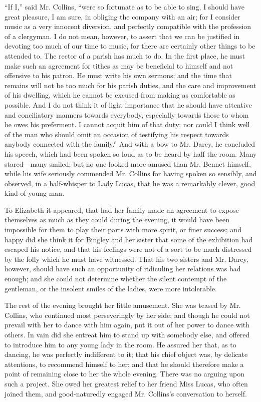 \documentclass[10pt]{book}
\begin{document}
   “If I,” said Mr. Collins, “were so fortunate as to be able to sing, I
should have great pleasure, I am sure, in obliging the company with an
air; for I consider music as a very innocent diversion, and perfectly
compatible with the profession of a clergyman. I do not mean, however,
to assert that we can be justified in devoting too much of our time to
music, for there are certainly other things to be attended to. The
rector of a parish has much to do. In the first place, he must make such
an agreement for tithes as may be beneficial to himself and not
offensive to his patron. He must write his own sermons; and the time
that remains will not be too much for his parish duties, and the care
and improvement of his dwelling, which he cannot be excused from making
as comfortable as possible. And I do not think it of light importance
that he should have attentive and conciliatory manners towards
everybody, especially towards those to whom he owes his preferment. I
cannot acquit him of that duty; nor could I think well
   of the man who
should omit an occasion of testifying his respect towards anybody
connected with the family.” And with a bow to Mr. Darcy, he concluded
his speech, which had been spoken so loud as to be heard by half the
room. Many stared—many smiled; but no one looked more amused than Mr.
Bennet himself, while his wife seriously commended Mr. Collins for
having spoken so sensibly, and observed, in a half-whisper to Lady
Lucas, that he was a remarkably clever, good kind of young man.
  

   To Elizabeth it appeared, that had her family made an agreement to
expose themselves as much as they could during the evening, it would
have been impossible for them to play their parts with more spirit, or
finer success; and happy did she think it for Bingley and her sister
that some of the exhibition had escaped his notice, and that his
feelings were not of a sort to be much distressed by the folly which he
must have witnessed. That his two sisters and Mr. Darcy, however, should
have such an opportunity of ridiculing her relations was bad enough; and
she could not determine whether the silent contempt of the gentleman, or
the insolent smiles of the ladies, were more intolerable.
  

   The rest of the evening brought her little amusement. She was teased by
Mr. Collins, who continued most perseveringly by her side; and though he
could not prevail with her to dance with him again, put it out of her
power to dance with others. In vain did she entreat him to stand up with
somebody else, and offered to introduce him to any young lady in the
room. He assured her that, as to dancing, he was perfectly indifferent
to it; that his chief object was, by delicate attentions, to recommend
himself to her; and that he
   should therefore make a point of remaining
close to her the whole evening. There was no arguing upon such a
project. She owed her greatest relief to her friend Miss Lucas, who
often joined them, and good-naturedly engaged Mr. Collins’s conversation
to herself.
  
\end{document}
